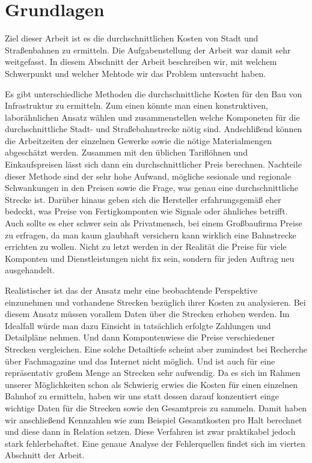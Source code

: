 \section{Grundlagen}

Ziel dieser Arbeit ist es die durchschnittlichen Kosten von Stadt und Straßenbahnen zu ermitteln. Die Aufgabenstellung der Arbeit war damit sehr weitgefasst. In diesem Abschnitt der Arbeit beschreiben wir, mit welchem Schwerpunkt und welcher Mehtode wir das Problem untersucht haben.


Es gibt unterschiedliche Methoden die durchschnittliche Kosten für den Bau von Infrastruktur zu ermitteln. Zum einen könnte man einen konstruktiven, laborähnlichen Ansatz wählen und zusammenstellen welche Komponeten für die durchschnittliche Stadt- und Straßebahnstrecke nötig sind. Andschlißend können die Arbeitzeiten der einzelnen Gewerke sowie die nötige Materialmengen abgeschätzt werden. Zusammen mit den üblichen Tariflöhnen und Einkaufspreisen lässt sich dann ein durchschnittlicher Preis berechnen. Nachteile dieser Methode sind der sehr hohe Aufwand, mögliche sesionale und regionale Schwankungen in den Preisen sowie die Frage, was genau eine durchschnittliche Strecke ist. Darüber hinaus geben sich die Hersteller erfahrungsgemäß eher bedeckt, was Preise von Fertigkomponten wie Signale oder ähnliches betrifft. Auch sollte es eher schwer sein als Privatmensch, bei einem Großbaufirma Preise zu erfragen, da man kaum glaubhaft versichern kann wirklich eine Bahnstrecke errichten zu wollen. Nicht zu letzt werden in der Realität die Preise für viele Komponten und Dienstleistungen nicht fix sein, sondern für jeden Auftrag neu ausgehandelt.

Realistischer ist das der Ansatz mehr eine beobachtende Perspektive einzunehmen und vorhandene Strecken bezüglich ihrer Kosten zu analysieren. Bei diesem Ansatz müssen vorallem Daten über die Strecken erhoben werden. Im Idealfall würde man dazu Einsicht in tatsächlich erfolgte Zahlungen und Detailpläne nehmen. Und dann Kompontenwiese die Preise verschiedener Strecken vergleichen. Eine solche Detailtiefe scheint aber zumindest bei Recherche über Fachmagazine und das Internet nicht möglich. Und ist auch für eine repräsentativ großem Menge an Strecken sehr aufwendig. Da es sich im Rahmen unserer Möglichkeiten schon als Schwierig erwies die Kosten für einen einzelnen Bahnhof zu ermitteln, haben wir uns statt dessen darauf konzentiert einge wichtige Daten für die Strecken sowie den Gesamtpreis zu sammeln. Damit haben wir anschließend Kennzahlen wie zum Beispiel Gesamtkosten pro Halt berechnet und diese dann in Relation setzen. Diese Verfahren ist zwar praktikabel jedoch stark fehlerbehaftet. Eine genaue Analyse der Fehlerquellen findet sich im vierten Abschnitt der Arbeit.

